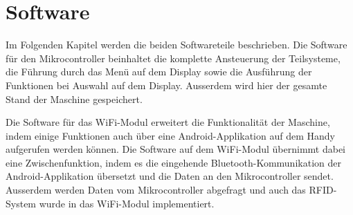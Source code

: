 \newpage
\section{Software}
\label{sec:Software}

Im Folgenden Kapitel werden die beiden Softwareteile beschrieben. Die Software für den Mikrocontroller beinhaltet die komplette Ansteuerung der Teilsysteme, die Führung durch das Menü auf dem Display sowie die Ausführung der Funktionen bei Auswahl auf dem Display. Ausserdem wird hier der gesamte Stand der Maschine gespeichert.

Die Software für das WiFi-Modul erweitert die Funktionalität der Maschine, indem einige Funktionen auch über eine Android-Applikation auf dem Handy aufgerufen werden können. Die Software auf dem WiFi-Modul übernimmt dabei eine Zwischenfunktion, indem es die eingehende Bluetooth-Kommunikation der Android-Applikation übersetzt und die Daten an den Mikrocontroller sendet. Ausserdem werden Daten vom Mikrocontroller abgefragt und auch das RFID-System wurde in das WiFi-Modul implementiert.